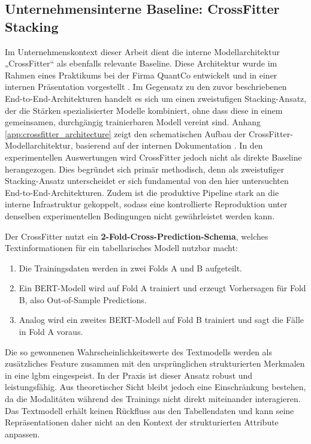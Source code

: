 \subsection{Unternehmensinterne Baseline: CrossFitter Stacking}
\label{sec:crossfitter}
Im Unternehmenskontext dieser Arbeit dient die interne Modellarchitektur „CrossFitter“ als ebenfalls relevante Baseline. Diese Architektur wurde im Rahmen eines Praktikums bei der Firma QuantCo entwickelt und in einer internen Präsentation vorgestellt \cite{Fuest2024Internship}. Im Gegensatz zu den zuvor beschriebenen End-to-End-Architekturen handelt es sich um einen zweistufigen Stacking-Ansatz, der die Stärken spezialisierter Modelle kombiniert, ohne dass diese in einem gemeinsamen, durchgängig trainierbaren Modell vereint sind. Anhang \ref{app:crossfitter_architecture} zeigt den schematischen Aufbau der CrossFitter-Modellarchitektur, basierend auf der internen Dokumentation \cite{Fuest2024Internship}. 
In den experimentellen Auswertungen wird CrossFitter jedoch nicht als direkte Baseline herangezogen. Dies begründet sich primär methodisch, denn als zweistufiger Stacking-Ansatz unterscheidet er sich fundamental von den hier untersuchten End-to-End-Architekturen. Zudem ist die produktive Pipeline stark an die interne Infrastruktur gekoppelt, sodass eine kontrollierte Reproduktion unter denselben experimentellen Bedingungen nicht gewährleistet werden kann.

Der CrossFitter nutzt ein \textbf{2-Fold-Cross-Prediction-Schema}, welches Textinformationen für ein tabellarisches Modell nutzbar macht:
\begin{enumerate}
    \item Die Trainingsdaten werden in zwei Folds A und B aufgeteilt.
    \item Ein BERT-Modell wird auf Fold A trainiert und erzeugt Vorhersagen für Fold B, also Out-of-Sample Predictions.
    \item Analog wird ein zweites BERT-Modell auf Fold B trainiert und sagt die Fälle in Fold A voraus.
\end{enumerate}
Die so gewonnenen Wahrscheinlichkeitswerte des Textmodells werden als zusätzliches Feature zusammen mit den ursprünglichen strukturierten Merkmalen in eine \Gls{lgbm} eingespeist. In der Praxis ist dieser Ansatz robust und leistungsfähig. Aus theoretischer Sicht bleibt jedoch eine Einschränkung bestehen, da die Modalitäten während des Trainings nicht direkt miteinander interagieren. Das Textmodell erhält keinen Rückfluss aus den Tabellendaten und kann seine Repräsentationen daher nicht an den Kontext der strukturierten Attribute anpassen.

